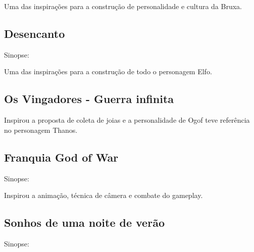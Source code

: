 Uma das inspirações para a construção de personalidade e cultura da Bruxa.
\subsection{Desencanto}
Sinopse:

Uma das inspirações para a construção de todo o personagem Elfo.
\subsection{Os Vingadores - Guerra infinita}
Inspirou a proposta de coleta de joias e a personalidade de Ogof teve referência no personagem Thanos.
\subsection{Franquia God of War}
Sinopse:

Inspirou a animação, técnica de câmera e combate do gameplay.
\subsection{Sonhos de uma noite de verão}
Sinopse:

